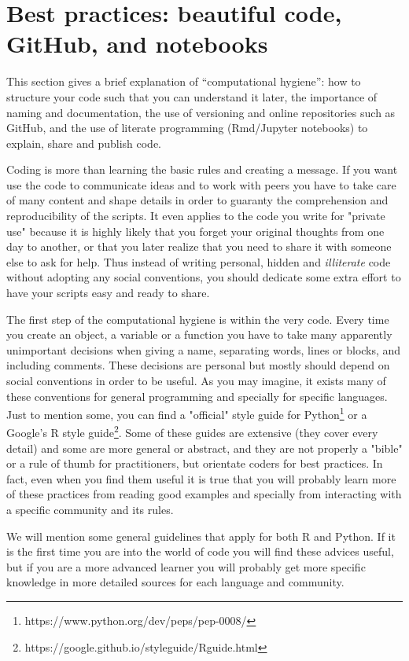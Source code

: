 \section{Best practices: beautiful code, GitHub, and notebooks}
\label{sec:practices}


This section gives a brief explanation of ``computational hygiene'': how to structure your code such that you can understand it later, the importance of naming and documentation, the use of versioning and online repositories such as GitHub, and the use of literate programming (Rmd/Jupyter notebooks) to explain, share and publish code.

Coding is more than learning the basic rules and creating a message. If you want use the code to communicate ideas and to work with peers you have to take care of many content and shape details in order to guaranty the comprehension and reproducibility of the scripts. It even applies to the code you write for "private use" because it is highly likely that you forget your original thoughts from one day to another, or that you later realize that you need to share it with someone else to ask for help. Thus instead of writing personal, hidden and \textit{illiterate} code without adopting any social conventions, you should dedicate some extra effort to have your scripts easy and ready to share.

The first step of the computational hygiene is within the very code. Every time you create an object, a variable or a function you have to take many apparently unimportant decisions when giving a name, separating words, lines or blocks, and including comments. These decisions are personal but mostly should depend on social conventions in order to be useful. As you may imagine, it exists many of these conventions for general programming and specially for specific languages. Just to mention some, you can find a "official" style guide for Python\footnote{https://www.python.org/dev/peps/pep-0008/}  or a Google's R style guide\footnote{https://google.github.io/styleguide/Rguide.html}. Some of these guides are extensive (they cover every detail) and some are more general or abstract, and they are not properly a "bible" or a rule of thumb for practitioners, but orientate  coders for best practices. In fact, even when you find them useful it is true that you will probably learn more of these practices from reading good examples and specially from interacting with a specific community and its rules.

We will mention some general guidelines that apply for both R and Python. If it is the first time you are into the world of code you will find these advices useful,  but if you are a more advanced learner you will probably get more specific knowledge in more detailed sources for each language and community.

